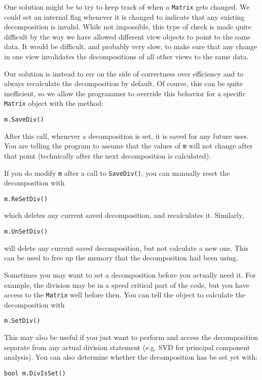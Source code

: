 \documentclass[twoside,letterpaper,11pt]{article}
\renewcommand{\tt}[1]{{\texttt {#1}}}
\begin{document}
One solution might be to try to keep track of when a \tt{Matrix} gets changed.  
We could set an
internal flag whenever it is changed to indicate that
any existing decomposition is invalid.  While not impossible,
this type of check is made
quite difficult by the way we have allowed different view objects to point to the same data.  
It would
be difficult, and probably very slow, to make sure that any change in one view invalidates the decompositions
of all other views to the same data.

Our solution is instead to err on the side of correctness over efficiency and
to always recalculate the decomposition by default.  Of course, this
can be quite inefficient, so we allow the programmer to override this
behavior for a specific \tt{Matrix} object with the method:
\begin{verbatim}
m.SaveDiv()
\end{verbatim}
After this call, whenever a decomposition is set, it is saved for any future uses.
You are telling the program to assume that the values of \tt{m} will not change after 
that point (technically after
the next decomposition is calculated).

If you do modify \tt{m} after a call to \tt{SaveDiv()}, 
you can manually reset the decomposition with
\begin{verbatim}
m.ReSetDiv()
\end{verbatim}
which deletes any current saved decomposition, and recalculates it.
Similarly,
\begin{verbatim}
m.UnSetDiv()
\end{verbatim}
will delete any current saved decomposition, but not calculate a new one.
This can be used to free up the memory that the decomposition had been using.

Sometimes you may want to set a decomposition before you actually need it.
For example, the division may be in a speed critical part of the code, but you have
access to the \tt{Matrix} well before then.  
You can tell the object to calculate the decomposition with
\begin{verbatim}
m.SetDiv()
\end{verbatim}
This may also be useful if you just want to perform and access the decomposition
separate from any actual division statement (e.g. SVD for principal component analysis).
You can also determine whether the decomposition has be set yet with:
\begin{verbatim}
bool m.DivIsSet()
\end{verbatim}
\end{document}
